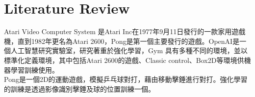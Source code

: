 \chapter{Literature Review}
Atari Video Computer System 是Atari Inc在1977年9月11日發行的一款家用遊戲機，直到1982年更名為Atari 2600，Pong是第一個主要發行的遊戲。OpenAI是一個人工智慧研究實驗室，研究著重於強化學習，Gym 具有多種不同的環境，並以標準化定義環境，其中包括Atari 2600的遊戲、Classic control、Box2D等環境供機器學習訓練使用。\\

Pong是一個2D的運動遊戲，模擬乒乓球對打，藉由移動擊錘進行對打。強化學習的訓練是透過影像識別擊錘及球的位置訓練一個。\\